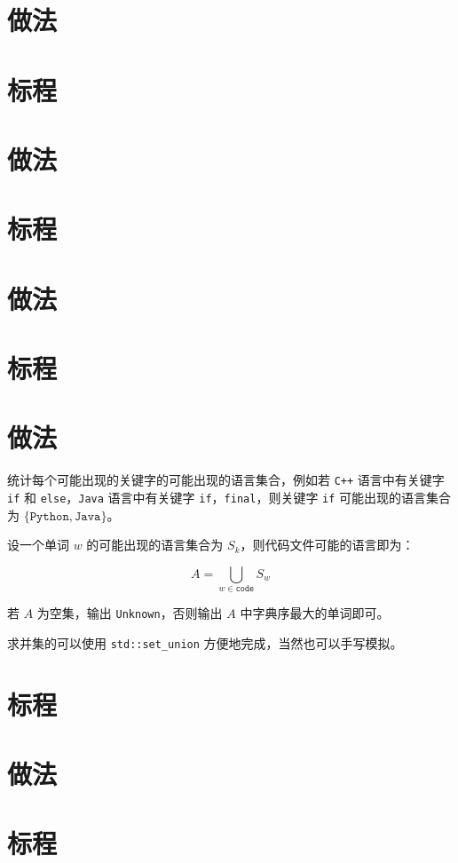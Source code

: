 \documentclass{../cpct/ctsol}
\begin{document}
\makesolution
\section*{做法}

\section*{标程}


\makesolution
\section*{做法}

\section*{标程}


\makesolution
\section*{做法}

\section*{标程}


\makesolution
\section*{做法}

统计每个可能出现的关键字的可能出现的语言集合，例如若 \texttt{C++} 语言中有关键字 \texttt{if} 和 \texttt{else}，\texttt{Java} 语言中有关键字 \texttt{if}，\texttt{final}，则关键字 \texttt{if} 可能出现的语言集合为 $\{\texttt{Python}, \texttt{Java}\}$。

设一个单词 $w$ 的可能出现的语言集合为 $S_k$，则代码文件可能的语言即为：

$$A = \bigcup\limits_{w \in \texttt{code}} S_w$$

若 $A$ 为空集，输出 \texttt{Unknown}，否则输出 $A$ 中字典序最大的单词即可。

求并集的可以使用 \lstinline{std::set_union} 方便地完成，当然也可以手写模拟。

\section*{标程}


\makesolution
\section*{做法}

\section*{标程}

\end{document}
